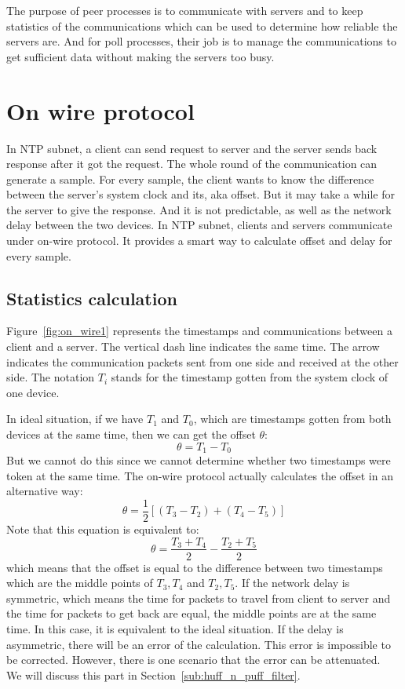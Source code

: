 

The purpose of peer processes is to communicate with servers and to keep
statistics of the communications which can be used to determine how reliable
the servers are. And for poll processes, their job is to manage the
communications to get sufficient data without making the servers too busy.

\section{On wire protocol}%
\label{sec:on_wire_protocol}
In NTP subnet, a client can send request to server and the server sends back
response after it got the request. The whole round of the communication can
generate a sample. For every sample, the client wants to know the difference
between the server's system clock and its, aka offset.
But it may take a while for the server to give the response. And it is not
predictable, as well as the network delay between the two devices.
In NTP subnet, clients and servers communicate under on-wire protocol. It
provides a smart way to calculate offset and delay for every sample. 

\subsection{Statistics calculation}%
\label{sub:statistics_calculation}
Figure~\ref{fig:on_wire1} represents the timestamps and communications between
a client and a server. The vertical dash line indicates the same time. The
arrow indicates the communication packets sent from one side and received at
the other side. The notation $T_i$ stands for the timestamp gotten from the
system clock of one device. 



In ideal situation, if we have $T_1$ and $T_0$, which are timestamps gotten
from both devices at the same time, then we can get the offset $\theta$:
$$\theta = T_1 - T_0$$
But we cannot do this since we cannot determine whether two timestamps were
token at the same time. The on-wire protocol actually calculates the offset in
an alternative way:
\begin{equation}
    \theta = \frac{1}{2}\left[(T_3 - T_2) + (T_4 - T_5)\right]
    \label{eq:offset_def}
\end{equation}
Note that this equation is equivalent to:
$$\theta = \frac{T_3 + T_4}{2} - \frac{T_2 + T_5}{2}$$
which means that the offset is equal to the difference between two timestamps
which are the middle points of $T_3, T_4$ and $T_2, T_5$. 
If the network delay is symmetric, which means the time for
packets to travel from client to server and the time for packets to get back
are equal, the middle points are at the same time. In this case, it is
equivalent to the ideal situation. If the delay is asymmetric, there will be an
error of the calculation. This error is impossible to be corrected. However,
there is one scenario that the error can be attenuated.~\cite{redbook} We will
discuss this part in Section~\ref{sub:huff_n_puff_filter}.

